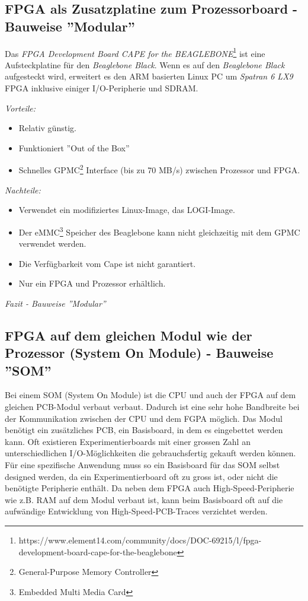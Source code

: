 \subsection{FPGA als Zusatzplatine zum Prozessorboard - Bauweise ''Modular''}
Das \textit{FPGA Development Board CAPE for the BEAGLEBONE}\footnote{https://www.element14.com/community/docs/DOC-69215/l/fpga-development-board-cape-for-the-beaglebone} ist eine Aufsteckplatine für den \textit{Beaglebone Black}.
Wenn es auf den \textit{Beaglebone Black} aufgesteckt wird, erweitert es den ARM basierten Linux PC um \textit{Spatran 6 LX9} FPGA inklusive einiger I/O-Peripherie und SDRAM.

\textit{Vorteile:}
\begin{itemize}
	\item Relativ günstig.
	\item Funktioniert ''Out of the Box''
	\item Schnelles GPMC\footnote{General-Purpose Memory Controller} Interface (bis zu 70 MB/s) zwischen Prozessor und FPGA.
\end{itemize}

\textit{Nachteile:}
\begin{itemize}
	\item Verwendet ein modifiziertes Linux-Image, das LOGI-Image.
	\item Der eMMC\footnote{Embedded Multi Media Card} Speicher des Beaglebone kann nicht gleichzeitig mit dem GPMC verwendet werden.
	\item Die Verfügbarkeit vom Cape ist nicht garantiert.
	\item Nur ein FPGA und Prozessor erhältlich.
\end{itemize}

\textit{Fazit - Bauweise ''Modular''}

\subsection{FPGA auf dem gleichen Modul wie der Prozessor (System On Module) - Bauweise ''SOM''}
Bei einem SOM (System On Module) ist die CPU und auch der FPGA auf dem gleichen PCB-Modul verbaut verbaut.
Dadurch ist eine sehr hohe Bandbreite bei der Kommunikation zwischen der CPU und dem FGPA möglich.
Das Modul benötigt ein zusätzliches PCB, ein Basisboard, in dem es eingebettet werden kann.
Oft existieren Experimentierboards mit einer grossen Zahl an unterschiedlichen I/O-Möglichkeiten die gebrauchsfertig gekauft werden können.
Für eine spezifische Anwendung muss so ein Basisboard für das SOM selbst designed werden, da ein Experimentierboard oft zu gross ist, oder nicht die benötigte Peripherie enthält.
Da neben dem FPGA auch High-Speed-Peripherie wie z.B. RAM auf dem Modul verbaut ist, kann beim Basisboard oft auf die aufwändige Entwicklung von High-Speed-PCB-Traces verzichtet werden.

